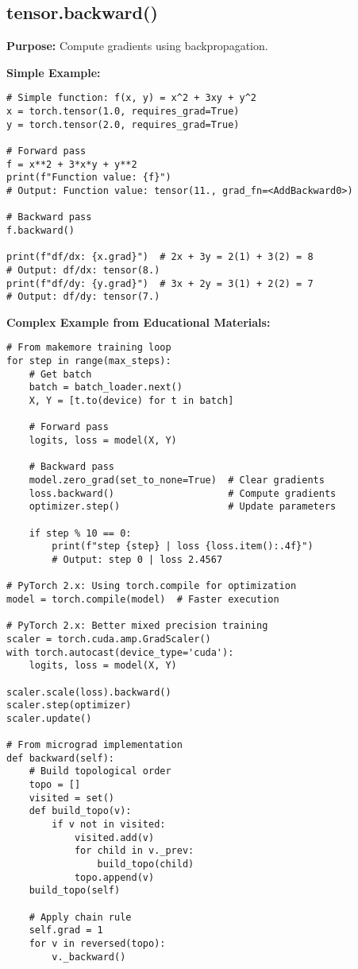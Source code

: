 \documentclass[11pt,a4paper]{book}
\begin{document}
\subsection{tensor.backward()}

\textbf{Purpose:} Compute gradients using backpropagation.

\textbf{Simple Example:}
\begin{verbatim}
# Simple function: f(x, y) = x^2 + 3xy + y^2
x = torch.tensor(1.0, requires_grad=True)
y = torch.tensor(2.0, requires_grad=True)

# Forward pass
f = x**2 + 3*x*y + y**2
print(f"Function value: {f}")
# Output: Function value: tensor(11., grad_fn=<AddBackward0>)

# Backward pass
f.backward()

print(f"df/dx: {x.grad}")  # 2x + 3y = 2(1) + 3(2) = 8
# Output: df/dx: tensor(8.)
print(f"df/dy: {y.grad}")  # 3x + 2y = 3(1) + 2(2) = 7
# Output: df/dy: tensor(7.)
\end{verbatim}

\textbf{Complex Example from Educational Materials:}
\begin{verbatim}
# From makemore training loop
for step in range(max_steps):
    # Get batch
    batch = batch_loader.next()
    X, Y = [t.to(device) for t in batch]
    
    # Forward pass
    logits, loss = model(X, Y)
    
    # Backward pass
    model.zero_grad(set_to_none=True)  # Clear gradients
    loss.backward()                    # Compute gradients
    optimizer.step()                   # Update parameters
    
    if step % 10 == 0:
        print(f"step {step} | loss {loss.item():.4f}")
        # Output: step 0 | loss 2.4567

# PyTorch 2.x: Using torch.compile for optimization
model = torch.compile(model)  # Faster execution

# PyTorch 2.x: Better mixed precision training
scaler = torch.cuda.amp.GradScaler()
with torch.autocast(device_type='cuda'):
    logits, loss = model(X, Y)
    
scaler.scale(loss).backward()
scaler.step(optimizer)
scaler.update()

# From micrograd implementation
def backward(self):
    # Build topological order
    topo = []
    visited = set()
    def build_topo(v):
        if v not in visited:
            visited.add(v)
            for child in v._prev:
                build_topo(child)
            topo.append(v)
    build_topo(self)
    
    # Apply chain rule
    self.grad = 1
    for v in reversed(topo):
        v._backward()
\end{verbatim}
\end{document}
